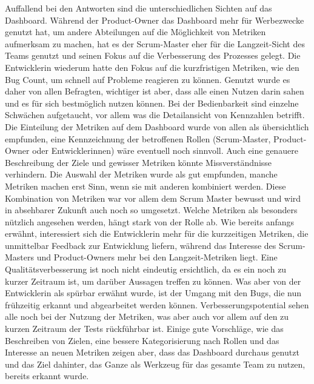 Auffallend bei den Antworten sind die unterschiedlichen Sichten auf das Dashboard.
Während der Product-Owner das Dashboard mehr für Werbezwecke genutzt hat, um andere Abteilungen auf die Möglichkeit von Metriken aufmerksam zu machen, hat es der Scrum-Master eher für die Langzeit-Sicht des Teams genutzt und seinen Fokus auf die Verbesserung des Prozesses gelegt.
Die Entwicklerin wiederum hatte den Fokus auf die kurzfristigen Metriken, wie den Bug Count, um schnell auf Probleme reagieren zu können.
Genutzt wurde es daher von allen Befragten, wichtiger ist aber, dass alle einen Nutzen darin sahen und es für sich bestmöglich nutzen können.
Bei der Bedienbarkeit sind einzelne Schwächen aufgetaucht, vor allem was die Detailansicht von Kennzahlen betrifft.
Die Einteilung der Metriken auf dem Dashboard wurde von allen als übersichtlich empfunden, eine Kennzeichnung der betroffenen Rollen (Scrum-Master, Product-Owner oder Entwicklerinnen) wäre eventuell noch sinnvoll.
Auch eine genauere Beschreibung der Ziele und gewisser Metriken könnte Missverständnisse verhindern.
Die Auswahl der Metriken wurde als gut empfunden, manche Metriken machen erst Sinn, wenn sie mit anderen kombiniert werden.
Diese Kombination von Metriken war vor allem dem Scrum Master bewusst und wird in absehbarer Zukunft auch noch so umgesetzt.
Welche Metriken als besonders nützlich angesehen werden, hängt stark von der Rolle ab.
Wie bereits anfangs erwähnt, interessiert sich die Entwicklerin mehr für die kurzzeitigen Metriken, die unmittelbar Feedback zur Entwicklung liefern, während das Interesse des Scrum-Masters und Product-Owners mehr bei den Langzeit-Metriken liegt.
Eine Qualitätsverbesserung ist noch nicht eindeutig ersichtlich, da es ein noch zu kurzer Zeitraum ist, um darüber Aussagen treffen zu können.
Was aber von der Entwicklerin als spürbar erwähnt wurde, ist der Umgang mit den Bugs, die nun frühzeitig erkannt und abgearbeitet werden können.
Verbesserungspotential sehen alle noch bei der Nutzung der Metriken, was aber auch vor allem auf den zu kurzen Zeitraum der Tests rückführbar ist.
Einige gute Vorschläge, wie das Beschreiben von Zielen, eine bessere Kategorisierung nach Rollen und das Interesse an neuen Metriken zeigen aber, dass das Dashboard durchaus genutzt und das Ziel dahinter, das Ganze als Werkzeug für das gesamte Team zu nutzen, bereits erkannt wurde.
